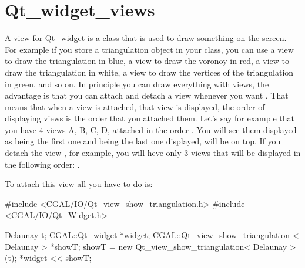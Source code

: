 \section{Qt\_widget\_views}
\label{Qt_widget_views}

A view for Qt\_widget is a class that is used to draw something on the screen. 
For example if you store a triangulation object in your class, you can use a 
view to draw the triangulation in blue, a view to draw the voronoy in red, a 
view to draw the triangulation in white, a view to draw the vertices of the 
triangulation in green, and so on. In principle you can draw everything with
views, the advantage is that you can attach and detach a view whenever you want
. That means that when a view is attached, that view is displayed, the order of
displaying views is the order that you attached them. Let's say for example 
that you have 4 views A, B, C, D, attached in the order . You 
will see them displayed as  being the first one and  
being the last one displayed,  will be on top. If you detach the 
view , for example, you will heve only 3 views that will be 
displayed in the following order: .

To attach this view all you have to do is:
\begin{ccExampleCode}
#include <CGAL/IO/Qt_view_show_triangulation.h>
#include <CGAL/IO/Qt_Widget.h>

Delaunay t;
CGAL::Qt_widget  *widget;
CGAL::Qt_view_show_triangulation < Delaunay >  *showT;
showT   = new Qt_view_show_triangulation< Delaunay >(t);
*widget << showT;

\end{ccExampleCode}










